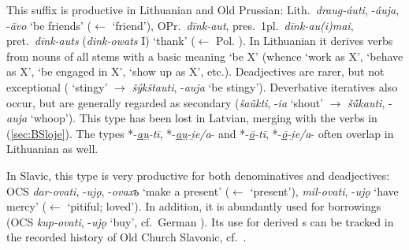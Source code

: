 \documentclass[output=paper,colorlinks,citecolor=brown]{langscibook}
\begin{document}
This suffix is productive in Lithuanian and Old Prussian: Lith.\ \textit{draug-áuti}, -\textit{áuja}, -\textit{ãvo} ‘be friends’ ($\leftarrow$  ‘friend’), OPr.\ \textit{dīnk-aut}, pres.\ 1pl.\ \textit{dīnk-au(i)mai}, pret.\ \textit{dīnk-auts} (\textit{dink-owats} I) ‘thank’ ($\leftarrow$ Pol. ). In Lithuanian it derives verbs from nouns of all stems with a basic meaning ‘be X’ (whence ‘work as X’, ‘behave as X’, ‘be engaged in X’, ‘show up as X’, etc.). Deadjectives are rarer, but not exceptional ( ‘stingy’ $\rightarrow$ \textit{šýkštauti}, -\textit{auja} ‘be stingy’). Deverbative iteratives also occur, but are generally regarded as secondary (\textit{šaũkti}, -\textit{ia} ‘shout’ $\rightarrow$ \textit{šū́kauti}, -\textit{auja} ‘whoop’). This type has been lost in Latvian, merging with the verbs in  (\ref{sec:BSloje}). The types *-\textit{\underline{au̯}-tī}, *-\textit{\underline{au̯}-i̯e/a}- and *-\textit{\underline{ō}-tī}, *-\textit{\underline{ō}-i̯e/a}- often overlap in Lithuanian as well.

In Slavic, this type is very productive for both denominatives and deadjectives:  OCS \textit{dar-ovati}, -\textit{ujǫ}, -\textit{ovaxъ} ‘make a present’ ($\leftarrow$  ‘present’), \textit{mil-ovati}, -\textit{ujǫ} ‘have mercy’ ($\leftarrow$  ‘pitiful; loved’). In addition, it is abundantly used for borrowings (OCS \textit{kup-ovati}, -\textit{ujǫ} ‘buy’, cf.\ German ). Its use for derived s can be tracked in the recorded history of Old Church Slavonic, cf.\ \citet[29--33]{Schuyt1990}. 
\end{document}
